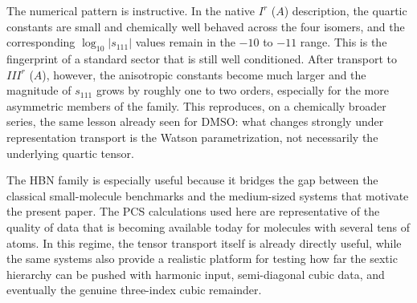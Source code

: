 \documentclass[aip,jcp,reprint,floatfix]{revtex4-2}
\begin{document}
The numerical pattern is instructive. In the native $I^r$ ($A$) description,
the quartic constants are small and chemically well behaved across the four
isomers, and the corresponding $\log_{10}|s_{111}|$ values remain in the
$-10$ to $-11$ range. This is the fingerprint of a standard sector that is
still well conditioned. After transport to $III^r$ ($A$), however, the
anisotropic constants become much larger and the magnitude of $s_{111}$ grows
by roughly one to two orders, especially for the more asymmetric members of
the family. This reproduces, on a chemically broader series, the same lesson
already seen for DMSO: what changes strongly under representation transport is
the Watson parametrization, not necessarily the underlying quartic tensor.

The HBN family is especially useful because it bridges the gap between the
classical small-molecule benchmarks and the medium-sized systems that motivate
the present paper. The PCS calculations used here are representative of the
quality of data that is becoming available today for molecules with several
tens of atoms. In this regime, the tensor transport itself is already directly
useful, while the same systems also provide a realistic platform for testing
how far the sextic hierarchy can be pushed with harmonic input, semi-diagonal
cubic data, and eventually the genuine three-index cubic remainder.
\end{document}
